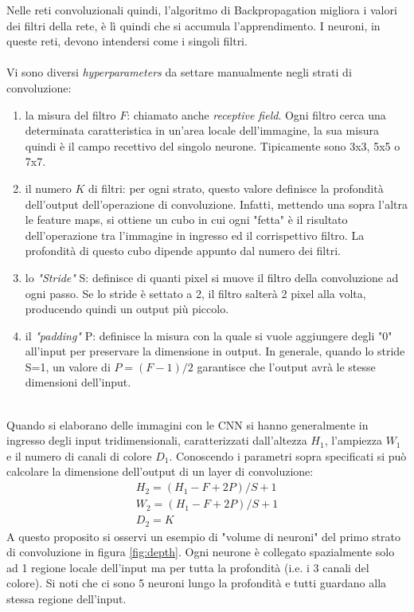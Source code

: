 Nelle reti convoluzionali quindi, l'algoritmo di Backpropagation migliora i valori dei filtri della rete, è lì quindi che si accumula l'apprendimento. I neuroni, in queste reti, devono intendersi come i singoli filtri.\\
\\
Vi sono diversi \emph{hyperparameters} da settare manualmente negli strati di convoluzione: 
\begin{enumerate}
\item la misura del filtro $F$: chiamato anche \emph{receptive field}. Ogni filtro cerca una determinata caratteristica in un'area locale dell'immagine, la sua misura quindi è il campo recettivo del singolo neurone. Tipicamente sono 3x3, 5x5 o 7x7.

\item il numero $K$ di filtri: per ogni strato, questo valore definisce la profondità dell'output dell'operazione di convoluzione. Infatti, mettendo una sopra l'altra le feature maps, si ottiene un cubo in cui ogni "fetta" è il risultato dell'operazione tra l'immagine in ingresso ed il corrispettivo filtro. La profondità di questo cubo dipende appunto dal numero dei filtri. 

\item lo \emph{"Stride"} S: definisce di quanti pixel si muove il filtro della convoluzione ad ogni passo. Se lo stride è settato a 2, il filtro salterà 2 pixel alla volta, producendo quindi un output più piccolo. 

\item il \emph{"padding"} P: definisce la misura con la quale si vuole aggiungere degli "0" all'input per preservare la dimensione in output. In generale, quando lo stride S=1, un valore di  $P = (F - 1)/2$ garantisce che l'output avrà le stesse dimensioni dell'input. 
\end{enumerate}
\\
Quando si elaborano delle immagini con le CNN si hanno generalmente in ingresso degli input tridimensionali, caratterizzati dall'altezza $H_1$, l'ampiezza $W_1$ e il numero di canali di colore $D_1$. Conoscendo i parametri sopra specificati si può calcolare la dimensione dell'output di un layer di convoluzione: 
\begin{align*}
H_2 = (H_1 - F + 2P)/S + 1\\
W_2 = (H_1 - F + 2P)/S + 1\\
D_2 = K
\end{align*}
A questo proposito si osservi un esempio di "volume di neuroni" del primo strato di convoluzione in figura \ref{fig:depth}. Ogni neurone è collegato spazialmente solo ad 1 regione locale dell'input ma per tutta la profondità (i.e. i 3 canali del colore). Si noti che ci sono 5 neuroni lungo la profondità e tutti guardano alla stessa regione dell'input.
